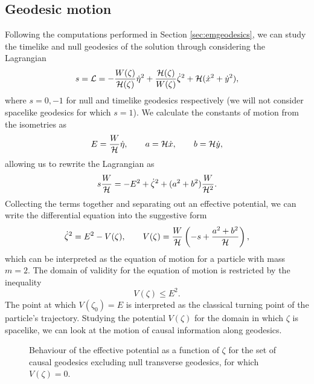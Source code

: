 \subsection{Geodesic motion}

Following the computations performed in Section \ref{sec:emgeodesics}, we can study the timelike and null geodesics of the solution through considering the Lagrangian
\begin{equation}
    s = {\cal L} = - \frac{W(\zeta)}{{\cal H}(\zeta)} \dot{\eta}^2 + \frac{{\cal H}(\zeta)}{W(\zeta)} \dot{\zeta}^2 + {\cal H} (\dot{x}^2 + \dot{y}^2),
\end{equation}
where $s=0,-1$ for null and timelike geodesics respectively (we will not consider spacelike geodesics for which $s = 1$). We calculate the constants of motion from the isometries as
\begin{equation*}
    E = \frac{W}{{\cal H}} \dot{\eta}, \qquad a = {\cal H} \dot{x}, \qquad b = {\cal H} \dot{y} ,
\end{equation*}
allowing us to rewrite the Lagrangian as
\begin{equation}
    s\frac{W}{{\cal H}} = -E^2 + \dot{\zeta}^2 + (a^2 + b^2)\frac{W}{{\cal H}^2}.
\end{equation}
Collecting the terms together and separating out an effective potential, we can write the differential equation into the suggestive form 
\begin{equation}
    \dot{\zeta}^2 = E^2 - V(\zeta), \qquad V(\zeta) = \frac{W}{{\cal H}} \left(-s + \frac{a^2 + b^2}{{\cal H}} \right),
\end{equation}
which can be interpreted as the equation of motion for a particle with mass $m=2$. The domain of validity for the equation of motion is restricted by the inequality
\begin{equation*}
    V(\zeta) \leq E^2.
\end{equation*}
The point at which $V(\zeta_0)=E$ is interpreted as the classical turning point of the particle's trajectory. Studying the potential $V(\zeta)$ for the domain in which $\zeta$ is spacelike, we can look at the motion of causal information along geodesics.

\begin{figure}[h!]
\centering
{}
\caption[The effective potential for the motion of geodesics in the planar symmetric solutions of the STU model]{Behaviour of the effective potential as a function of $\zeta$ for the set of causal geodesics excluding null transverse geodesics, for which $V(\zeta) = 0$.}
\label{fig:3pot}
\end{figure}

